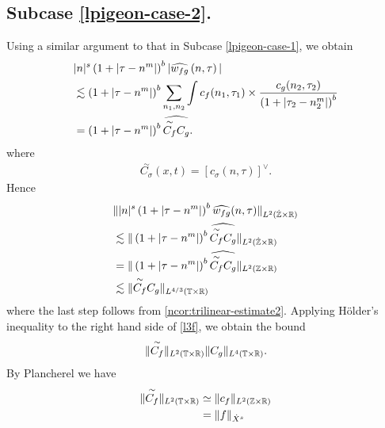 \subsection{Subcase \ref{lpigeon-case-2}.}
Using a similar argument to that in Subcase \eqref{lpigeon-case-1}, we obtain
%
%
\begin{equation}
	\label{l1f}
	\begin{split}
		 & |n|^s \left( 1 + | \tau - n^{m } | \right)^{b} | \widehat{w_{fg}}\left( 
		n, \tau \right) |
		\\
		& \lesssim \left( 1 + | \tau - n^{m } | \right)^{b}
		\sum_{n_1, n_2} \int
		c_f(n_1, \tau_1)
		\times
		\frac{c_g(n_2, \tau_2)}{\left( 1 + | \tau_2 - n_2^{m } | 
		\right)^{b}} 
		\\
		& = \left( 1 + | \tau - n^{m } | \right)^{b} \widehat{\overset{\sim}{C_f} C_g}.
	\end{split}
\end{equation}
%
where
%
%
\begin{equation*}
	\begin{split}
		\overset{\sim}{C_\sigma}(x,t) = \left[ c_\sigma(n, \tau) \right]^\vee.
	\end{split}
\end{equation*}
%
%
Hence
%
\begin{equation}
	\label{l3f}
	\begin{split}
		& \| |n|^s \left( 1 + | \tau - n^{m } | \right)^{b} \widehat{w_{fg}}(n, \tau) 
		\|_{L^2(\dot{\mathbb{Z}} \times \mathbb{R})}
		\\
		& \lesssim \|\left( 1 + | \tau - n^{m} | \right)^{b} 
		\widehat{\overset{\sim}{C_f} C_g } \|_{L^2(\dot{\mathbb{Z}} \times \mathbb{R})}
		\\
		& =  \|\left( 1 + | \tau - n^{m} | \right)^{b} 
		\widehat{\overset{\sim}{C_f} C_g } \|_{L^2(\mathbb{Z} \times \mathbb{R})}
		\\
		& \lesssim  \|\overset{\sim}{C_f} C_g  \|_{L^{4/3}(\mathbb{T} \times \mathbb{R})}
	\end{split}
\end{equation}
%
where the last step follows from \cref{ncor:trilinear-estimate2}. Applying
H\"{o}lder's inequality to the right hand side of \eqref{l3f}, we obtain the
bound
%
\begin{equation}
	\label{l4f}
	\begin{split}
		\|\overset{\sim}{C_f} \|_{L^2(\mathbb{T} \times \mathbb{R})} \|C_g \|_{L^4\left( \mathbb{T} 
		\times \mathbb{R} 
		\right)}. 
	\end{split}
\end{equation}
%
By Plancherel we have
%
%
\begin{equation}
	\label{l5f}
	\begin{split}
		\|\overset{\sim}{C_f} \|_{L^2(\mathbb{T} \times \mathbb{R})}
		& \simeq \|c_f\|_{L^2(\mathbb{Z} \times \mathbb{R})}
		\\
		& = \|f \|_{\dot{X}^s}
	\end{split}
\end{equation}
